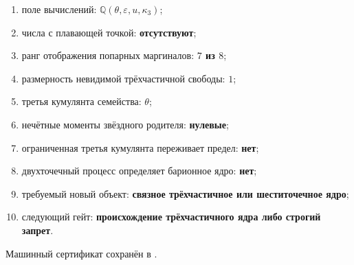 \begin{protocol}
\begin{enumerate}
 \item поле вычислений: \textbf{$\mathbb Q(\theta,\varepsilon,u,\kappa_3)$};
 \item числа с плавающей точкой: \textbf{отсутствуют};
 \item ранг отображения попарных маргиналов: \textbf{$7$ из $8$};
 \item размерность невидимой трёхчастичной свободы: \textbf{$1$};
 \item третья кумулянта семейства: \textbf{$\theta$};
 \item нечётные моменты звёздного родителя: \textbf{нулевые};
 \item ограниченная третья кумулянта переживает предел: \textbf{нет};
 \item двухточечный процесс определяет барионное ядро: \textbf{нет};
 \item требуемый новый объект:
       \textbf{связное трёхчастичное или шеститочечное ядро};
 \item следующий гейт:
       \textbf{происхождение трёхчастичного ядра либо строгий запрет}.
\end{enumerate}
\end{protocol}

Машинный сертификат сохранён в
.